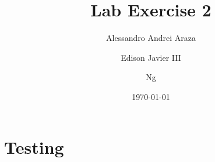 \documentclass{report}
\title{Lab Exercise 2}
\author{Alessandro Andrei Araza \and Edison Javier III \and Ng}
\date{\today}
\begin{document}
\maketitle

\chapter{Testing}

\blindtext
\end{document}
